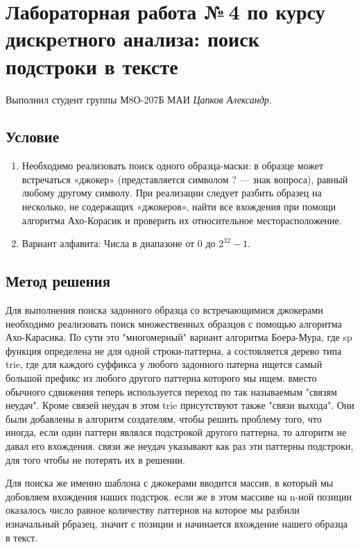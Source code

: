 \documentclass[12pt]{article}
\begin{document}
\section*{Лабораторная работа №\,4 по курсу дискрeтного анализа: поиск подстроки в тексте}

Выполнил студент группы М8О-207Б МАИ \textit{Цапков Александр}.

\subsection*{Условие}

\begin{enumerate}
\item Необходимо реализовать поиск одного образца-маски: в образце может встречаться «джокер» (представляется символом ? — знак вопроса), равный любому другому символу. При реализации следует разбить образец на несколько, не содержащих «джокеров», найти все вхождения при помощи алгоритма Ахо-Корасик и проверить их относительное месторасположение.
\item Вариант алфавита: Числа в диапазоне от $0$ до  $2^32 - 1$.
\end{enumerate}

\subsection*{Метод решения}

Для выполнения поиска задонного образца со встречающимися джокерами необходимо
 реализовать поиск множественных образцов с помощью алгоритма Ахо-Карасика. 
 По сути это "многомерный" вариант алгоритма Боера-Мура, где sp функция
  определена не для одной строки-паттерна, а состовляется дерево типа trie, 
  где для каждого суффикса у любого задонного патерна ищется самый большой 
  префикс из любого другого паттерна которого мы ищем. вместо обычного 
  сдвижения теперь используется переход по так называемым "связям неудач". 
  Кроме связей неудач в этом trie присутствуют также "связи выхода". Они были 
  добавлены в алгоритм создателям, чтобы решить проблему того, что иногда, если 
  один паттерн являлся подстрокой другого паттерна, то алгоритм не давал его 
  вхождения. связи же неудач указывают как раз эти паттерны подстроки, для 
  того чтобы не потерять их в решении. 

Для поиска же именно шаблона с джокерами вводится массив, в который мы 
добовляем вхождения наших подстрок. если же в этом массиве на n-ной 
позиции оказалось число равное количеству паттернов на которое мы разбили 
изначальный рбразец, значит с позиции и начинается вхождение нашего образца
 в текст.
\end{document}
